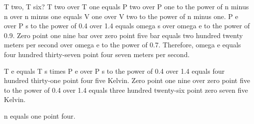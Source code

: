 T two, T six?
T two over T one equals P two over P one to the power of n minus n over n minus one equals V one over V two to the power of n minus one.
P e over P s to the power of 0.4 over 1.4 equals omega s over omega e to the power of 0.9.
Zero point one nine bar over zero point five bar equals two hundred twenty meters per second over omega e to the power of 0.7.
Therefore, omega e equals four hundred thirty-seven point four seven meters per second.

T e equals T s times P e over P s to the power of 0.4 over 1.4 equals four hundred thirty-one point four five Kelvin.
Zero point one nine over zero point five to the power of 0.4 over 1.4 equals three hundred twenty-six point zero seven five Kelvin.

n equals one point four.